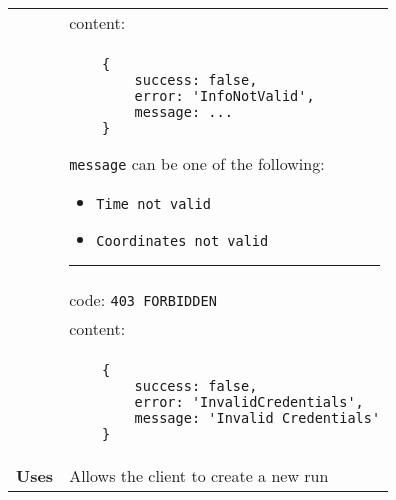 \begin{adjustwidth}{1cm}{}
\begin{longtable}{|c|l|}
                &                         content: \\
                & \begin{minipage}[t]{0.7\textwidth}
                    \begin{adjustwidth}{1.5cm}{}
                    \begin{verbatim}
    {
        success: false, 
        error: 'InfoNotValid',
        message: ...
    }
                    \end{verbatim}
                    \end{adjustwidth}
                    \texttt{message} can be one of the following: 
                    \begin{itemize}
                        \item \texttt{Time not valid}
                        \item \texttt{Coordinates not valid}
                    \end{itemize}
                     \par\noindent\rule{\textwidth}{1pt}
                 \vspace{4pt}
                  \end{minipage} \\
                & code: \texttt{403 FORBIDDEN} \\
                &                         content: \\
                & \begin{minipage}[t]{0.7\textwidth}
                    \begin{adjustwidth}{1.5cm}{}
                    \begin{verbatim}
    {
        success: false, 
        error: 'InvalidCredentials',
        message: 'Invalid Credentials'
    }
                    \end{verbatim}
                    \end{adjustwidth}
                  \end{minipage} \\
                  \hline
                \textbf{Uses} & Allows the client to create a new run \\
                \hline
                

\end{longtable}
\end{adjustwidth}
